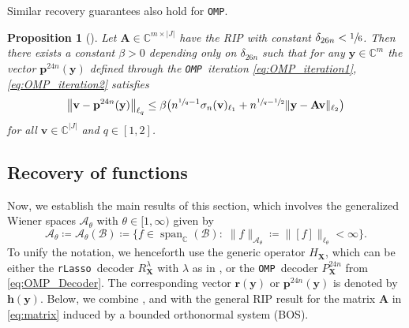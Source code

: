 \documentclass[11pt,reqno, a4paper]{article}
\numberwithin{equation}{section}
\newtheorem{prop}[theorem]{Proposition}
\newcommand{\C}{\mathbb{C}}
\newcommand{\rlasso}{\texttt{rLasso}}
\newcommand{\omp}{\texttt{OMP}}
\DeclareMathOperator{\spann}{span}
\begin{document}
Similar recovery guarantees also hold for \omp.

\begin{prop}[{\cite[Thm.\ 6.25]{FoRa13}}]\label{prop:OMP_for_RIP}
    Let $\mathbf{A}\in\mathbb{C}^{m\times \lvert J\rvert}$ have the RIP with constant $\delta_{26n}<\sfrac{1}{6}$.
    Then there exists a constant $\beta>0$ depending only on $\delta_{26n}$ such that for any $\mathbf{y}\in\mathbb{C}^m$ the vector $\mathbf{p}^{24n}(\mathbf{y})$ defined through the \omp \ iteration \eqref{eq:OMP_iteration1}, \eqref{eq:OMP_iteration2} satisfies
    \begin{gather}
        \bigl\lVert\mathbf{v}-\mathbf{p}^{24n}(\mathbf{y})\bigr\rVert_{\ell_q}\leq \beta\bigl(n^{\sfrac{1}{q}-1}\sigma_n(\mathbf{v})_{\ell_1}+n^{\sfrac{1}{q}-\sfrac{1}{2}}\lVert\mathbf{y}-\mathbf{A}\mathbf{v}\rVert_{\ell_2}\bigr)
    \end{gather}
    for all $\mathbf{v}\in\mathbb{C}^{\lvert J\rvert}$ and $q\in[1,2]$.
\end{prop}

\subsection{Recovery of functions}
Now, we establish the main results of this section, which involves the generalized Wiener spaces $\mathcal{A}_{\theta}$ with  $\theta\in[1,\infty)$ given by
\begin{equation}\label{eq:DefWiener}
    \mathcal{A}_\theta \coloneqq \mathcal{A}_\theta(\mathcal{B}) \coloneqq\bigl\{f\in \spann_\C({\mathcal B})\colon \; \lVert f\rVert_{\mathcal{A}_\theta}\coloneqq \big\lVert [f] \big\rVert_{\ell_\theta}<\infty\bigr\}.
\end{equation}
To unify the notation, we henceforth use the generic operator $H_\mathbf{X}$, which can be either the \rlasso \ decoder $R_{\mathbf{X}}^{\lambda}$ with $\lambda$ as in , or the \omp \ decoder $P_{\mathbf{X}}^{24n}$ from \eqref{eq:OMP_Decoder}.
The corresponding vector $\mathbf{r}(\mathbf{y})$ or $\mathbf{p}^{24n}(\mathbf{y})$ is denoted by $\mathbf{h}(\mathbf{y})$.
Below, we combine ,  and  with the general RIP result  for the matrix $\mathbf{A}$ in \eqref{eq:matrix} induced by a bounded orthonormal system (BOS).
\end{document}
